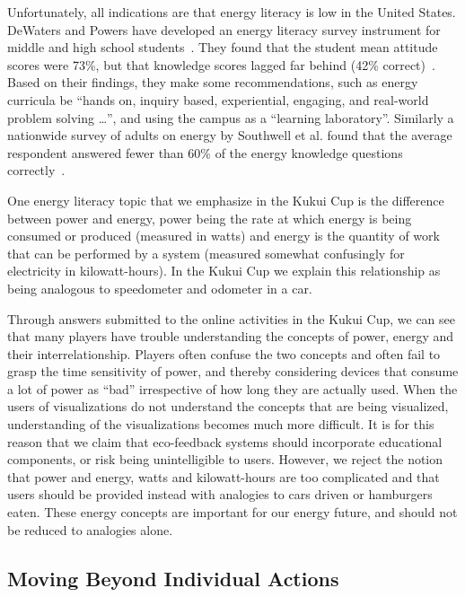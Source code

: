 \documentclass{sigchi}
\begin{document}
Unfortunately, all indications are that energy literacy is low in the United States. DeWaters and Powers have developed an energy literacy survey instrument for middle and high school students~\cite{DeWaters2007,DeWaters2008}. They found that the student mean attitude scores were 73\%, but that knowledge scores lagged far behind (42\% correct)~\cite{DeWaters2011}. Based on their findings, they make some recommendations, such as energy curricula be ``hands on, inquiry based, experiential, engaging, and real-world problem solving \ldots'', and using the campus as a ``learning laboratory''. Similarly a nationwide survey of adults on energy by Southwell et al. found that the average respondent answered fewer than 60\% of the energy knowledge questions correctly~\cite{Southwell2012}.

One energy literacy topic that we emphasize in the Kukui Cup is the difference between power and energy, power being the rate at which energy is being consumed or produced (measured in watts) and energy is the quantity of work that can be performed by a system (measured somewhat confusingly for electricity in kilowatt-hours). In the Kukui Cup we explain this relationship as being analogous to speedometer and odometer in a car.

Through answers submitted to the online activities in the Kukui Cup, we can see that many players have trouble understanding the concepts of power, energy and their interrelationship. Players often confuse the two concepts and often fail to grasp the time sensitivity of power, and thereby considering devices that consume a lot of power as ``bad'' irrespective of how long they are actually used. When the users of visualizations do not understand the concepts that are being visualized, understanding of the visualizations becomes much more difficult. It is for this reason that we claim that eco-feedback systems should incorporate educational components, or risk being unintelligible to users. However, we reject the notion that power and energy, watts and kilowatt-hours are too complicated and that users should be provided instead with analogies to cars driven or hamburgers eaten. These energy concepts are important for our energy future, and should not be reduced to analogies alone.


\subsection{Moving Beyond Individual Actions}
\end{document}
